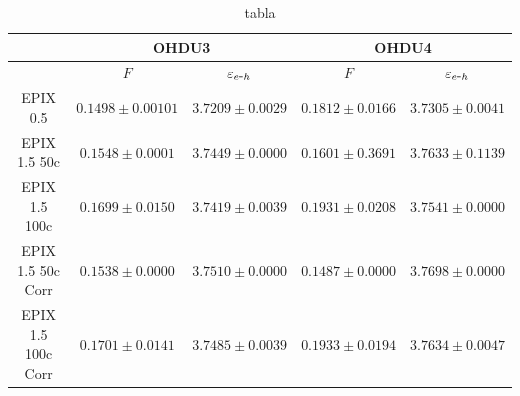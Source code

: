 \begin{table}[H]
\centering
\begin{tabular}{@{}ccccc@{}}
\toprule
                & \multicolumn{2}{c}{OHDU3}                 & \multicolumn{2}{c}{OHDU4}                 \\ \hline\hline
                & $F$                 & $\varepsilon_{e\mbox{-}h}$ & $F$                 & $\varepsilon_{e\mbox{-}h}$ \\
EPIX 0.5 & $0.1498 \pm 0.00101$ & $3.7209 \pm 0.0029$ & $0.1812 \pm 0.0166$ & $3.7305 \pm 0.0041$ \\ \hline
EPIX 1.5 50c & $0.1548 \pm 0.0001$ & $3.7449 \pm 0.0000$ & $0.1601 \pm 0.3691$ & $3.7633 \pm 0.1139$ \\
EPIX 1.5 100c & $0.1699 \pm 0.0150$ & $3.7419 \pm 0.0039$ & $0.1931 \pm 0.0208$ & $3.7541 \pm 0.0000$ \\ \hline
EPIX 1.5 50c  Corr& $0.1538 \pm 0.0000$ & $3.7510 \pm 0.0000$ & $0.1487 \pm 0.0000$ & $3.7698 \pm 0.0000$ \\
EPIX 1.5 100c Corr& $0.1701 \pm 0.0141$ & $3.7485 \pm 0.0039$ & $0.1933 \pm 0.0194$ & $3.7634 \pm 0.0047$ \\ \bottomrule \hline
\end{tabular}
\caption{tabla}
\label{tab:FanoEehOHDU3y4}
\end{table}

